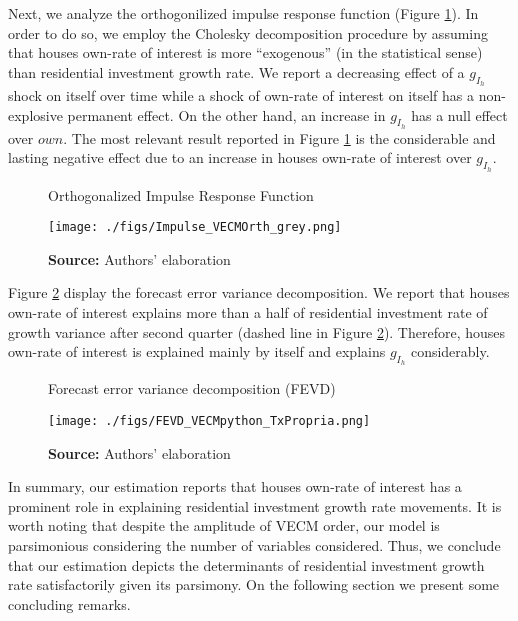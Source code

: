 \documentclass[12pt, a4paper]{article}
\begin{document}
Next, we analyze the orthogonilized impulse response function (Figure \ref{irf}).
In order to do so, we employ the Cholesky decomposition procedure by assuming that houses own-rate of interest is more ``exogenous'' (in the statistical sense) than residential investment growth rate.
We report a decreasing effect of a \(g_{I_h}\) shock on itself over time while a shock of own-rate of interest on itself has a non-explosive permanent effect.
On the other hand, an increase in \(g_{I_h}\) has a null effect over \(own\).
The most relevant result reported in Figure \ref{irf} is the considerable and lasting negative effect due to an increase in houses own-rate of interest over \(g_{I_h}\).

\begin{figure}[H]
	\centering
	\caption{Orthogonalized Impulse Response Function}
	\label{irf}
	\texttt{[image: ./figs/Impulse\_VECMOrth\_grey.png]}
	\caption*{\textbf{Source:} Authors' elaboration}
\end{figure}

Figure \ref{fevd} display the forecast error variance decomposition.
We report that houses own-rate of interest explains more than a half of residential investment rate of growth variance after second quarter (dashed line in Figure \ref{fevd}).
Therefore, houses own-rate of interest is explained mainly by itself and explains \(g_{I_h}\) considerably.

\begin{figure}[H]
	\centering
	\caption{Forecast error variance decomposition (FEVD)}
	\label{fevd}
	\texttt{[image: ./figs/FEVD\_VECMpython\_TxPropria.png]}
	\caption*{\textbf{Source:} Authors' elaboration}
\end{figure}


In summary, our estimation reports that houses own-rate of interest has a prominent role in explaining residential investment growth rate movements.
It is worth noting that despite the amplitude of VECM order, our model is parsimonious considering the number of variables considered.
Thus, we conclude that our estimation depicts the determinants of residential investment growth rate satisfactorily given its parsimony.
On the following section we present some concluding remarks.
\end{document}
